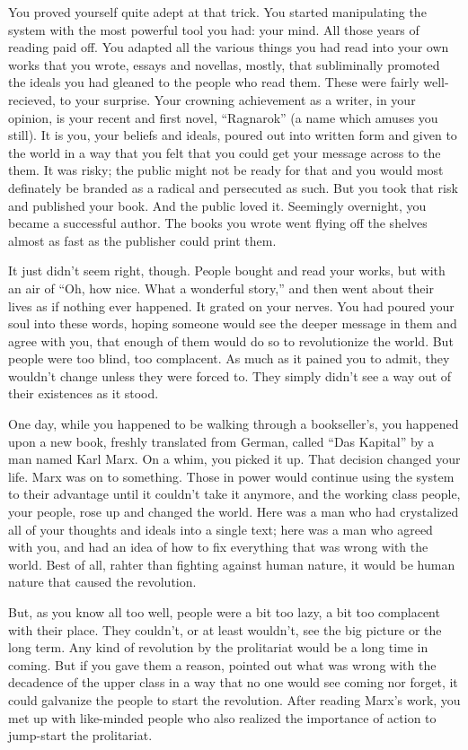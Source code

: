 \documentclass[char]{airship}
\begin{document}
You proved yourself quite adept at that trick.  You started
manipulating the system with the most powerful tool you had: your
mind.  All those years of reading paid off.  You adapted all the
various things you had read into your own works that you wrote, essays and novellas, mostly, that subliminally promoted the ideals you had gleaned to the people who read them.  These were fairly well-recieved, to your surprise.  Your crowning achievement as a writer, in your opinion, is your recent and first novel, ``Ragnarok'' (a name which amuses you still).  It is you, your beliefs and ideals, poured out into written form and given to the world in a way that you felt that you could get your message across to the them.  It was risky; the public might not be ready for that and you would most definately be branded as a radical and persecuted as such.  But you took that risk and published your book.  And the public loved it.  Seemingly overnight, you became a successful author.  The books you wrote went
flying off the shelves almost as fast as the publisher could print
them.

It just didn't seem right, though.  People bought and read your works,
but with an air of ``Oh, how nice.  What a wonderful story,'' and then
went about their lives as if nothing ever happened.  It grated on your
nerves.  You had poured your soul into these words, hoping someone
would see the deeper message in them and agree with you, that enough
of them would do so to revolutionize the world.  But people were too
blind, too complacent.  As much as it pained you to admit, they
wouldn't change unless they were forced to.  They simply didn't see a
way out of their existences as it stood.

One day, while you happened to be walking through a bookseller's, you
happened upon a new book, freshly translated from German, called ``Das
Kapital'' by a man named Karl Marx.  On a whim, you picked it up.
That decision changed your life.  Marx was on to something.  Those in
power would continue using the system to their advantage until it
couldn't take it anymore, and the working class people, your people,
rose up and changed the world.  Here was a man who had crystalized all
of your thoughts and ideals into a single text; here was a man who
agreed with you, and had an idea of how to fix everything that was
wrong with the world.  Best of all, rahter than fighting against human
nature, it would be human nature that caused the revolution.

But, as you know all too well, people were a bit too lazy, a bit too
complacent with their place.  They couldn't, or at least wouldn't, see
the big picture or the long term.  Any kind of revolution by the
prolitariat would be a long time in coming.  But if you gave them a
reason, pointed out what was wrong with the decadence of the upper
class in a way that no one would see coming nor forget, it could
galvanize the people to start the revolution.  After reading Marx's
work, you met up with like-minded people who also realized the
importance of action to jump-start the prolitariat.
\end{document}
